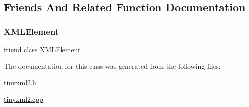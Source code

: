 \subsection{Friends And Related Function Documentation}
\mbox{\label{classtinyxml2_1_1_x_m_l_document_ac2fba9b6e452829dd892f7392c24e0eb}} 
\subsubsection{\texorpdfstring{X\+M\+L\+Element}{XMLElement}}
{\footnotesize\ttfamily friend class \hyperlink{classtinyxml2_1_1_x_m_l_element}{X\+M\+L\+Element}\hspace{0.3cm}{\ttfamily [friend]}}



The documentation for this class was generated from the following files\+:\begin{DoxyCompactItemize}
\item 
\hyperlink{tinyxml2_8h}{tinyxml2.\+h}\item 
\hyperlink{tinyxml2_8cpp}{tinyxml2.\+cpp}\end{DoxyCompactItemize}

